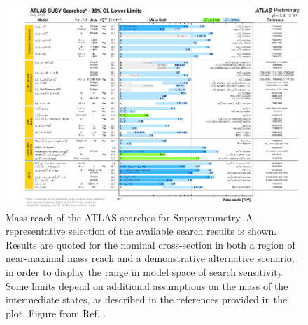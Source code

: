 \begin{figure}[htb]
	\centering
	\includegraphics[width=1.1\textwidth]{figures/summary_plots/ATLAS_SUSY_Summary.pdf}
	\caption{Mass reach of the ATLAS searches for Supersymmetry. 
	A representative selection of the available search results is shown. Results are quoted for the nominal cross-section 
	in both a region of near-maximal mass reach and a demonstrative alternative scenario, in order to display the range in 
	model space of search sensitivity. Some limits depend on additional assumptions on the mass of the intermediate states, 
	as described in the references provided in the plot. Figure from Ref. \cite{atlasSUSYSummary}.
	} 
	\label{fig:summary_atlas_summary}
\end{figure}

